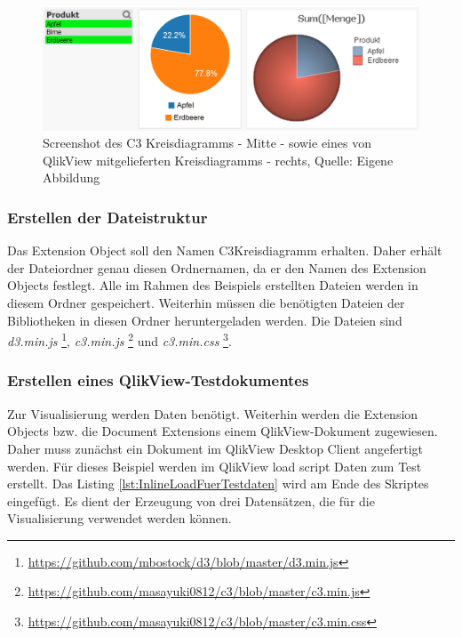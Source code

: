\ifIncludeFigures\begin{figure}
	\centering
		\includegraphics[width=1.00\textwidth]{img/KreisdiagrammScreenshot/Vergleich.PNG}
	\caption[Screenshot des C3 Kreisdiagramms]{Screenshot des C3 Kreisdiagramms - Mitte - sowie eines von QlikView mitgelieferten Kreisdiagramms - rechts, Quelle: Eigene Abbildung}
	\label{fig:Vergleich}
\end{figure}\fi

\subsubsection{Erstellen der Dateistruktur}

Das Extension Object soll den Namen C3Kreisdiagramm erhalten. Daher erhält der Datei\-ordner genau diesen Ordner\-namen, da er den Namen des Extension Objects festlegt. Alle im Rahmen des Beispiels erstellten Dateien werden in diesem Ordner gespeichert. Weiterhin müssen die benötigten Dateien der Bibliotheken in diesen Ordner heruntergeladen werden. Die Dateien sind \textit{d3.min.js} \footnote{\url{https://github.com/mbostock/d3/blob/master/d3.min.js}}, \textit{c3.min.js} \footnote{\url{https://github.com/masayuki0812/c3/blob/master/c3.min.js}} und \textit{c3.min.css} \footnote{\url{https://github.com/masayuki0812/c3/blob/master/c3.min.css}}.

\subsubsection{Erstellen eines QlikView-Testdokumentes}
\label{lab:ErstellenEinesQlikViewTestdokumentes} 

Zur Visualisierung werden Daten benötigt. Weiterhin werden die Extension Objects bzw. die Document Extensions einem QlikView-Dokument zugewiesen. Daher muss zunächst ein Dokument im QlikView Desktop Client angefertigt werden. Für dieses Beispiel werden im QlikView load script Daten zum Test erstellt. Das Listing \ref{lst:InlineLoadFuerTestdaten} wird am Ende des Skriptes eingefügt. Es dient der Erzeugung von drei Daten\-sätzen, die für die Visualisierung verwendet werden können.

